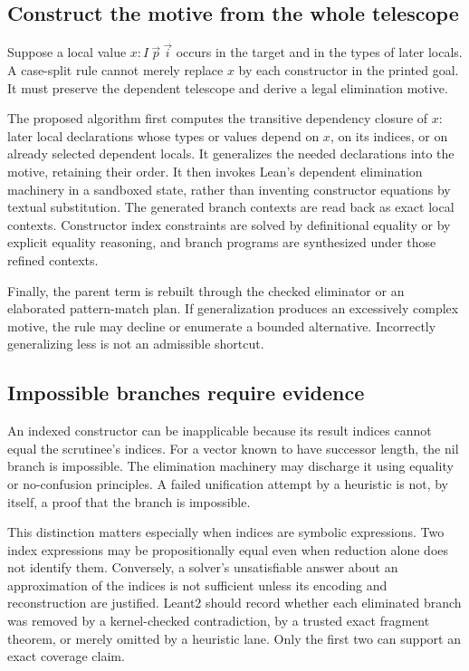 \subsection{Construct the motive from the whole telescope}
Suppose a local value $x:I\ \vec p\ \vec i$ occurs in the target and in the types of later locals. A case-split rule cannot merely replace $x$ by each constructor in the printed goal. It must preserve the dependent telescope and derive a legal elimination motive.

The proposed algorithm first computes the transitive dependency closure of $x$: later local declarations whose types or values depend on $x$, on its indices, or on already selected dependent locals. It generalizes the needed declarations into the motive, retaining their order. It then invokes Lean's dependent elimination machinery in a sandboxed state, rather than inventing constructor equations by textual substitution. The generated branch contexts are read back as exact local contexts. Constructor index constraints are solved by definitional equality or by explicit equality reasoning, and branch programs are synthesized under those refined contexts.

Finally, the parent term is rebuilt through the checked eliminator or an elaborated pattern-match plan. If generalization produces an excessively complex motive, the rule may decline or enumerate a bounded alternative. Incorrectly generalizing less is not an admissible shortcut.

\subsection{Impossible branches require evidence}
An indexed constructor can be inapplicable because its result indices cannot equal the scrutinee's indices. For a vector known to have successor length, the nil branch is impossible. The elimination machinery may discharge it using equality or no-confusion principles. A failed unification attempt by a heuristic is not, by itself, a proof that the branch is impossible.

This distinction matters especially when indices are symbolic expressions. Two index expressions may be propositionally equal even when reduction alone does not identify them. Conversely, a solver's unsatisfiable answer about an approximation of the indices is not sufficient unless its encoding and reconstruction are justified. Leant2 should record whether each eliminated branch was removed by a kernel-checked contradiction, by a trusted exact fragment theorem, or merely omitted by a heuristic lane. Only the first two can support an exact coverage claim.

